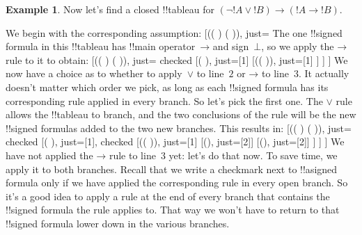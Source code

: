 \documentclass[10pt,a4paper]{article}
\theoremstyle{plain}
\theoremstyle{definition}
\newtheorem{ex}[thm]{Example}
\theoremstyle{remark}
\newenvironment{oltableau}{}{}
\providecommand{\lif}{\mathbin{\rightarrow}}
\providecommand{\sFmla}[2]{#1(#2)}
\providecommand{\formula}{\relax}
\providecommand{\True}{\top}
\providecommand{\False}{\bot}
\providecommand{\TAss}[1]{}
\providecommand{\TRule}[1]{}
\providecommand{\formula}[1]{#1}
\begin{document}
\begin{ex}
Now let's find a closed !!{tableau} for $(\lnot !A \lor !B) \lif (!A
\lif !B)$.

We begin with the corresponding assumption:
\begin{oltableau}
  [\sFmla{\False}{(\lnot \formula{A} \lor \formula{B}) \lif
      (\formula{A} \lif \formula{B})}, just=\TAss]
\end{oltableau}
The one !!{signed formula} in this !!{tableau} has !!{main operator}~$\lif$
and sign~$\False$, so we apply the $\TRule{\False}{\lif}$ rule to it
to obtain:
\begin{oltableau}
  [\sFmla{\False}{(\lnot \formula{A} \lor \formula{B})
      \lif (\formula{A} \lif \formula{B})}, just=\TAss, checked
    [\sFmla{\True}{\lnot \formula{A} \lor \formula{B}},
      just={\TRule{\False}{\lif}[1]}
      [\sFmla{\False}{(\formula{A} \lif \formula{B})},
        just={\TRule{\False}{\lif}[1]}
      ]
    ]
  ]
\end{oltableau}
We now have a choice as to whether to apply~$\TRule{\True}{\lor}$ to
line~$2$ or $\TRule{\False}{\lif}$ to line~$3$. It actually doesn't
matter which order we pick, as long as each !!{signed formula} has its
corresponding rule applied in every branch. So let's pick the first
one. The $\TRule{\True}{\lor}$ rule allows the !!{tableau} to branch,
and the two conclusions of the rule will be the new !!{signed formula}s
added to the two new branches. This results in:
\begin{oltableau}
  [\sFmla{\False}{(\lnot \formula{A} \lor \formula{B}) \lif
      (\formula{A} \lif \formula{B})}, just=\TAss, checked
    [\sFmla{\True}{\lnot \formula{A} \lor \formula{B}},
      just={\TRule{\False}{\lif}[1]}, checked
      [\sFmla{\False}{(\formula{A} \lif \formula{B})},
        just={\TRule{\False}{\lif}[1]}
        [\sFmla{\True}{\lnot \formula{A}}, just={\TRule{\True}{\lor}[2]}]
        [\sFmla{\True}{\formula{B}}, just={\TRule{\True}{\lor}[2]}]
      ]
    ]
  ]
\end{oltableau}
We have not applied the $\TRule{\False}{\lif}$ rule to line~$3$ yet:
let's do that now.  To save time, we apply it to both branches.
Recall that we write a checkmark next to !!a{signed formula} only if
we have applied the corresponding rule in every open branch. So it's a
good idea to apply a rule at the end of every branch that contains the
!!{signed formula} the rule applies to. That way we won't have to
return to that !!{signed formula} lower down in the various branches.
\begin{oltableau}

\end{oltableau}
\end{ex}
\end{document}
